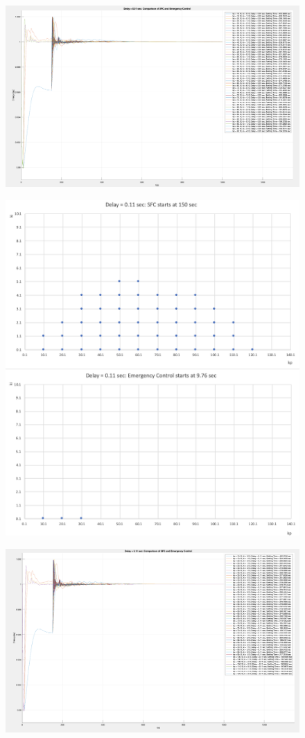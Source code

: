 \begin{figure}[htbp]
\centering
\includegraphics[width = .819\textwidth]{figure/6_4_CompaPlots_01.png}
\caption{}
\label{6_4_CompaPlots_01}
\end{figure}


\begin{figure}[htbp]
\centering
\includegraphics[width = .819\textwidth]{figure/6_4_copare_11.png}
\caption{}
\label{6_4_copare_11}
\end{figure}


\begin{figure}[htbp]
\centering
\includegraphics[width = .819\textwidth]{figure/6_4_CompaPlots_11.png}
\caption{}
\label{6_4_CompaPlots_11}
\end{figure}


